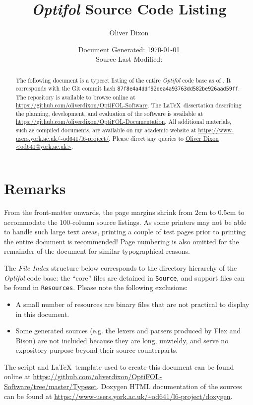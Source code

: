 \documentclass{article}
\title{\emph{Optifol} Source Code Listing}
\author{Oliver Dixon}
\date{%
    \texorpdfstring{%
        Document Generated: \today\\[1ex]%
        Source Last Modified: \DTMusedate{gitdate}%
    }%
    {\today}%
}
\newcommand\githash{87f8e4a4ddf92dea4a93763dd582be926aad59ff} %
\begin{document}
\maketitle
\begin{abstract}
    The following document is a typeset listing of the entire \emph{Optifol}
    code base as of . It corresponds with the Git commit
    hash \texttt{\githash}. The repository is available to browse online at
    \url{https://github.com/oliverdixon/OptiFOL-Software}. The \LaTeX\
    dissertation describing the planning, development, and evaluation of the
    software is available at
    \url{https://github.com/oliverdixon/OptiFOL-Documentation}. All additional
    materials, such as compiled documents, are available on my academic website
    at \url{https://www-users.york.ac.uk/~od641/l6-project/}. Please direct any
    queries to \href{mailto:Oliver Dixon <od641@york.ac.uk>}{Oliver Dixon
    <od641@york.ac.uk>}.
\end{abstract}
\section*{Remarks}

\begingroup%
\setlength\parskip{1em}%
From the front-matter onwards, the page margins shrink from $2$cm to $0.5$cm to
accommodate the 100-column source listings. As some printers may not be able to
handle such large text areas, printing a couple of test pages prior to printing
the entire document is recommended! Page numbering is also omitted for the
remainder of the document for similar typographical reasons.

The \emph{File Index} structure below corresponds to the directory hierarchy of
the \emph{Optifol} code base: the ``core'' files are detained in
\texttt{Source}, and support files can be found in \texttt{Resources}. Please
note the following exclusions:
\begin{itemize}
    \item A small number of resources are binary files that are not practical to
        display in this document.
    \item Some generated sources (e.g. the lexers and parsers produced by Flex
        and Bison) are not included because they are long, unwieldy, and serve
        no expository purpose beyond their source counterparts.
\end{itemize}

The script and \LaTeX\ template used to create this document can be found online
at \url{https://github.com/oliverdixon/OptiFOL-Software/tree/master/Typeset}.
Doxygen HTML documentation of the sources can be found at
\url{https://www-users.york.ac.uk/~od641/l6-project/doxygen}.

\begin{center}
\end{center}
\endgroup

\tableofcontents
\clearpage
{}

\end{document}
